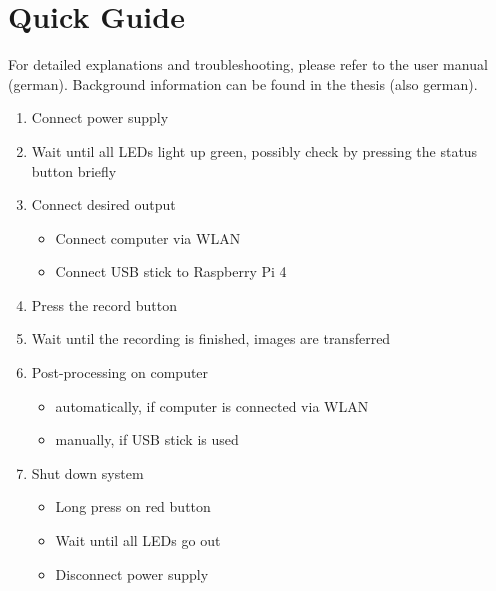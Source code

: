 \documentclass[./00PhotoBox.tex]{subfiles}
\begin{document}
\chapter{Quick Guide}

For detailed explanations and troubleshooting, please refer to the user manual (german). Background information can be found in the thesis (also german).

\begin{enumerate}
    \item Connect power supply
    \item Wait until all LEDs light up green, possibly check by pressing the status button briefly
    \item Connect desired output
          \begin{itemize}
              \item Connect computer via WLAN
              \item Connect USB stick to Raspberry Pi 4
          \end{itemize}
    \item Press the record button
    \item Wait until the recording is finished, images are transferred
    \item Post-processing on computer
          \begin{itemize}
              \item automatically, if computer is connected via WLAN
              \item manually, if USB stick is used
          \end{itemize}
    \item Shut down system
          \begin{itemize}
              \item Long press on red button
              \item Wait until all LEDs go out
              \item Disconnect power supply
          \end{itemize}
\end{enumerate}

\end{document}
